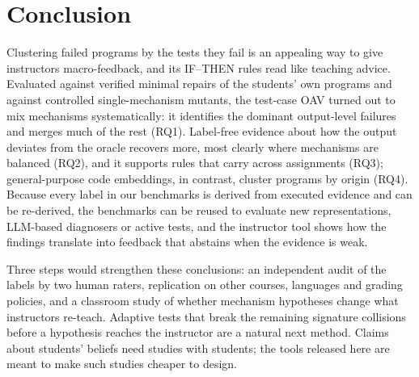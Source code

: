 \section{Conclusion}\label{sec:conclusion}

Clustering failed programs by the tests they fail is an appealing way to give instructors macro-feedback, and its IF--THEN rules read like teaching advice. Evaluated against verified minimal repairs of the students' own programs and against controlled single-mechanism mutants, the test-case OAV turned out to mix mechanisms systematically: it identifies the dominant output-level failures and merges much of the rest (RQ1). Label-free evidence about how the output deviates from the oracle recovers more, most clearly where mechanisms are balanced (RQ2), and it supports rules that carry across assignments (RQ3); general-purpose code embeddings, in contrast, cluster programs by origin (RQ4). Because every label in our benchmarks is derived from executed evidence and can be re-derived, the benchmarks can be reused to evaluate new representations, LLM-based diagnosers or active tests, and the instructor tool shows how the findings translate into feedback that abstains when the evidence is weak.

Three steps would strengthen these conclusions: an independent audit of the labels by two human raters, replication on other courses, languages and grading policies, and a classroom study of whether mechanism hypotheses change what instructors re-teach. Adaptive tests that break the remaining signature collisions before a hypothesis reaches the instructor are a natural next method. Claims about students' beliefs need studies with students; the tools released here are meant to make such studies cheaper to design.
